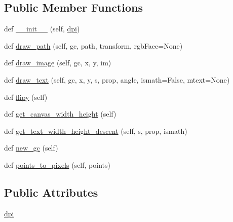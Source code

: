 \subsection*{Public Member Functions}
\begin{DoxyCompactItemize}
\item 
def \hyperlink{classmatplotlib_1_1backends_1_1backend__template_1_1RendererTemplate_a5c42704542fd9860e25de51be9701f5c}{\+\_\+\+\_\+init\+\_\+\+\_\+} (self, \hyperlink{classmatplotlib_1_1backends_1_1backend__template_1_1RendererTemplate_a6be3f31243de882ee3776137708985d7}{dpi})
\item 
def \hyperlink{classmatplotlib_1_1backends_1_1backend__template_1_1RendererTemplate_a94c7529eeca511fb6a24e8baf4cffc54}{draw\+\_\+path} (self, gc, path, transform, rgb\+Face=None)
\item 
def \hyperlink{classmatplotlib_1_1backends_1_1backend__template_1_1RendererTemplate_a9ecd6542b7377fa09974c5d35750fa76}{draw\+\_\+image} (self, gc, x, y, im)
\item 
def \hyperlink{classmatplotlib_1_1backends_1_1backend__template_1_1RendererTemplate_acfde0c2c28d1c5944c20ba1c5a865f55}{draw\+\_\+text} (self, gc, x, y, s, prop, angle, ismath=False, mtext=None)
\item 
def \hyperlink{classmatplotlib_1_1backends_1_1backend__template_1_1RendererTemplate_a1b41da3f289b55115b2c8238660e5ac3}{flipy} (self)
\item 
def \hyperlink{classmatplotlib_1_1backends_1_1backend__template_1_1RendererTemplate_ae9f260acf79269648cb68d344afda03d}{get\+\_\+canvas\+\_\+width\+\_\+height} (self)
\item 
def \hyperlink{classmatplotlib_1_1backends_1_1backend__template_1_1RendererTemplate_af243bc8ee47daab581b9546311792b47}{get\+\_\+text\+\_\+width\+\_\+height\+\_\+descent} (self, s, prop, ismath)
\item 
def \hyperlink{classmatplotlib_1_1backends_1_1backend__template_1_1RendererTemplate_a1023a15cd4831ae105c180358a22483e}{new\+\_\+gc} (self)
\item 
def \hyperlink{classmatplotlib_1_1backends_1_1backend__template_1_1RendererTemplate_ae6e6c73c990636f25a785f66178046c0}{points\+\_\+to\+\_\+pixels} (self, points)
\end{DoxyCompactItemize}
\subsection*{Public Attributes}
\begin{DoxyCompactItemize}
\item 
\hyperlink{classmatplotlib_1_1backends_1_1backend__template_1_1RendererTemplate_a6be3f31243de882ee3776137708985d7}{dpi}
\end{DoxyCompactItemize}


